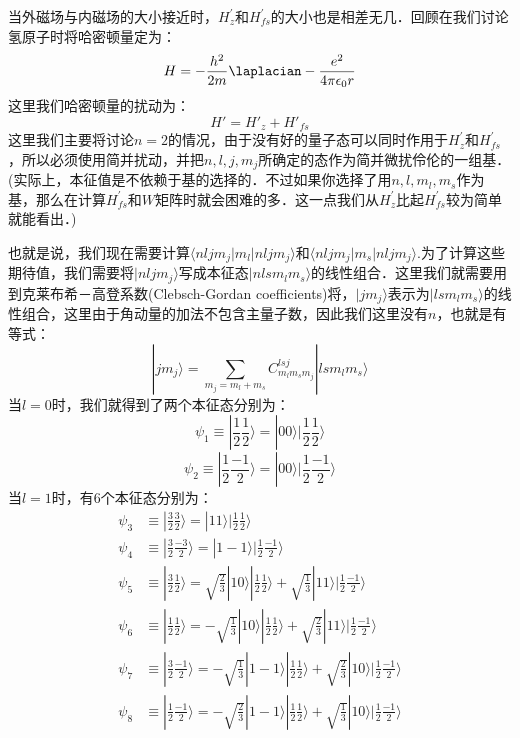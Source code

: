 当外磁场与内磁场的大小接近时，$H_z^{'}$和$H_{fs}^{'}$的大小也是相差无几．回顾在我们讨论氢原子时将哈密顿量定为：\begin{equation}
H=-\frac{h^2}{2m}\laplacian-\frac{e^2}{4\pi\epsilon_0 r}
\end{equation}
这里我们哈密顿量的扰动为：
\begin{equation}
H'=H'_z+H'_{fs}
\end{equation}
这里我们主要将讨论$n=2$的情况，由于没有好的量子态可以同时作用于$H_z^{'}$和$H_{fs}^{'}$，所以必须使用简并扰动，并把$n,l,j,m_j$所确定的态作为简并微扰伶伦的一组基．(实际上，本征值是不依赖于基的选择的．不过如果你选择了用$n,l,m_l,m_s$作为基，那么在计算$H_{fs}^{'}$和$W$矩阵时就会困难的多．这一点我们从$H_z^{'}$比起$H_{fs}^{'}$较为简单就能看出．)

也就是说，我们现在需要计算$\langle nljm_j|m_l|nljm_j\rangle$和$\langle nljm_j|m_s|nljm_j\rangle$.为了计算这些期待值，我们需要将$|nljm_j\rangle$写成本征态$|nlsm_lm_s\rangle$的线性组合．这里我们就需要用到克莱布希－高登系数(Clebsch-Gordan coefficients)将，$|jm_j\rangle$表示为$|lsm_lm_s\rangle$的线性组合，这里由于角动量的加法不包含主量子数，因此我们这里没有$n$，也就是有等式：
\begin{equation}
|jm_j\rangle = \sum_{m_j=m_l+m_s}C^{lsj}_{m_lm_sm_j}|lsm_lm_s\rangle
\end{equation}
当$l=0$时，我们就得到了两个本征态分别为：
\begin{equation}
\psi_1\equiv|\frac{1}{2}\frac{1}{2}\rangle=|00\rangle|\frac{1}{2}\frac{1}{2}\rangle
\end{equation}
\begin{equation}
\psi_2\equiv|\frac{1}{2}\frac{-1}{2}\rangle=|00\rangle|\frac{1}{2}\frac{-1}{2}\rangle
\end{equation}
当$l=1$时，有$6$个本征态分别为：
\begin{align}
\psi_3&\equiv|\frac{3}{2}\frac{3}{2}\rangle=|11\rangle|\frac{1}{2}\frac{1}{2}\rangle\\
\psi_4&\equiv|\frac{3}{2}\frac{-3}{2}\rangle=|1-1\rangle|\frac{1}{2}\frac{-1}{2}\rangle\\
\psi_5&\equiv|\frac{3}{2}\frac{1}{2}\rangle=\sqrt{\frac{2}{3}}|10\rangle|\frac{1}{2}\frac{1}{2}\rangle+\sqrt{\frac{1}{3}}|11\rangle|\frac{1}{2}\frac{-1}{2}\rangle\\
\psi_6&\equiv|\frac{1}{2}\frac{1}{2}\rangle=-\sqrt{\frac{1}{3}}|10\rangle|\frac{1}{2}\frac{1}{2}\rangle+\sqrt{\frac{2}{3}}|11\rangle|\frac{1}{2}\frac{-1}{2}\rangle\\
\psi_7&\equiv|\frac{3}{2}\frac{-1}{2}\rangle=-\sqrt{\frac{1}{3}}|1-1\rangle|\frac{1}{2}\frac{1}{2}\rangle+\sqrt{\frac{2}{3}}|10\rangle|\frac{1}{2}\frac{-1}{2}\rangle\\
\psi_8&\equiv|\frac{1}{2}\frac{-1}{2}\rangle=-\sqrt{\frac{2}{3}}|1-1\rangle|\frac{1}{2}\frac{1}{2}\rangle+\sqrt{\frac{1}{3}}|10\rangle|\frac{1}{2}\frac{-1}{2}\rangle\\
\end{align}
